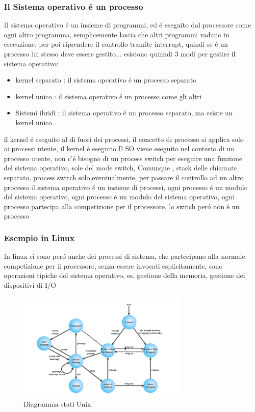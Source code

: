 \documentclass[11pt]{article}
\begin{document}
\subsubsection{Il Sistema operativo é un processo}
Il sistema operativo é un insieme di programmi, ed é eseguito dal processore come ogni altro programma, semplicemente
lascia che altri programmi vadano in esecuzione, per poi riprendere il controllo tramite interrupt, quindi se é un processo lui stesso
deve essere gestito...
esistono quinndi 3 modi per gestire il sistema operativo:
\begin{itemize}
    \item kernel separato : il sistema operativo é un processo separato
    \item kernel unico : il sistema operativo é un processo come gli altri
    \item Sistemi ibridi : il sistema operativo é un processo separato, ma esiste un kernel unico
\end{itemize}
il kernel é eseguito al di fuori dei processi, il concetto di processo si applica solo ai processi utente, il kernel é eseguito
Il SO viene eseguito nel contesto di un processo utente, non c'é bisogno di un process switch per eseguire una funzione del sistema operativo,
sole del mode switch, Comunque , stack delle chiamate separato, process switch solo,eventualmente, per passare il controllo ad un altro processo
il sistema operativo é un insieme di processi, ogni processo é un modulo del sistema operativo, ogni processo é un modulo del sistema operativo,
ogni processo partecipa alla competizione per il processore, lo switch peró non é un processo
\subsubsection{Esempio in Linux}
In linux ci sono peró anche dei processi di sistema, che partecipano alla normale competizione per il processore, senza essere invocati esplicitamente,
sono operazioni tipiche del sistema operativo, es. gestione della memoria, gestione dei dispositivi di I/O
\begin{figure}
    \centering
    \includegraphics[width=0.75\textwidth]{immagini/transizioneTraStatiDeiProcessi}
    \caption{Diagramma stati Unix}
\end{figure}
\end{document}
